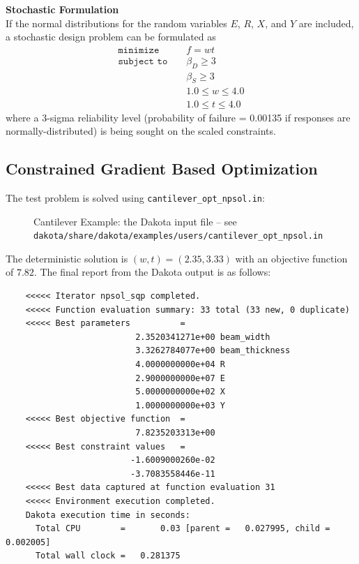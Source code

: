 {\bf Stochastic Formulation } \\
If the normal distributions for the random variables $E$, $R$, $X$,
and $Y$ are included, a stochastic design problem can be formulated as
\begin{eqnarray}
\texttt{minimize }   & & f = w t            \nonumber\\
\texttt{subject to } & & \beta_{D} \geq 3   \label{additional:cantouu}\\
                     & & \beta_{S} \geq 3   \nonumber\\
                     & & 1.0 \leq w \leq 4.0\nonumber\\
                     & & 1.0 \leq t \leq 4.0\nonumber
\end{eqnarray}
where a 3-sigma reliability level (probability of failure = 0.00135 if
responses are normally-distributed) is being sought on the scaled
constraints.

\subsection{Constrained Gradient Based Optimization}
The test problem is solved using {\tt cantilever\_opt\_npsol.in}:
\begin{figure}[ht!]
  \centering
  \begin{small}
    \begin{bigbox}
    \end{bigbox}
  \end{small}
  \caption{Cantilever Example: the Dakota input file --
see \texttt{dakota/share/dakota/examples/users/cantilever\_opt\_npsol.in} }
  \label{additional:cant_opt_npsol}
\end{figure}

The deterministic solution is $(w,t)=(2.35,3.33)$ with an objective
function of $7.82$. The final report from the Dakota output is as
follows:
\begin{small}
\begin{verbatim}
    <<<<< Iterator npsol_sqp completed.
    <<<<< Function evaluation summary: 33 total (33 new, 0 duplicate)
    <<<<< Best parameters          =
                          2.3520341271e+00 beam_width
                          3.3262784077e+00 beam_thickness
                          4.0000000000e+04 R
                          2.9000000000e+07 E
                          5.0000000000e+02 X
                          1.0000000000e+03 Y
    <<<<< Best objective function  =
                          7.8235203313e+00
    <<<<< Best constraint values   =
                         -1.6009000260e-02
                         -3.7083558446e-11
    <<<<< Best data captured at function evaluation 31
    <<<<< Environment execution completed.
    Dakota execution time in seconds:
      Total CPU        =       0.03 [parent =   0.027995, child =   0.002005]
      Total wall clock =   0.281375
\end{verbatim}
\end{small}

